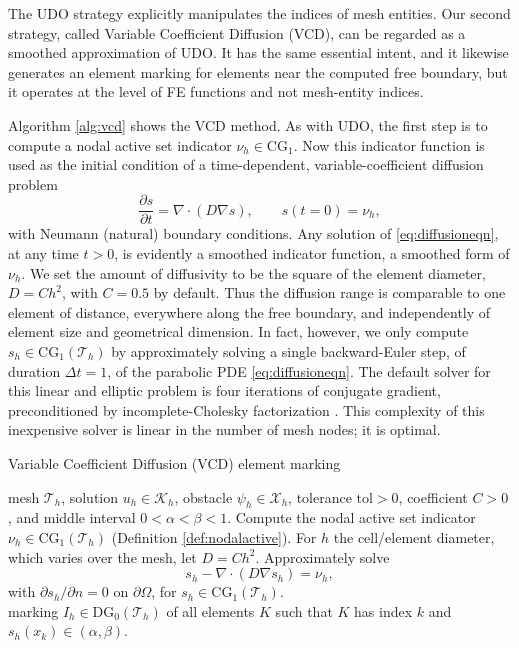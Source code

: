 \documentclass[]{interact}
\theoremstyle{plain}%
\theoremstyle{definition}
\theoremstyle{remark}
\newcommand{\grad}{\nabla}
\newcommand{\Div}{\nabla\cdot}
\newcommand{\cK}{\mathcal{K}}
\newcommand{\cT}{\mathcal{T}}
\newcommand{\cX}{\mathcal{X}}
\newcommand{\CG}{\text{CG}}
\newcommand{\DG}{\text{DG}}
\begin{document}
The UDO strategy explicitly manipulates the indices of mesh entities.  Our second strategy, called Variable Coefficient Diffusion (VCD), can be regarded as a smoothed approximation of UDO.  It has the same essential intent, and it likewise generates an element marking for elements near the computed free boundary, but it operates at the level of FE functions and not mesh-entity indices.

Algorithm \ref{alg:vcd} shows the VCD method.  As with UDO, the first step is to compute a nodal active set indicator $\nu_h \in \CG_1$.  Now this indicator function is used as the initial condition of a time-dependent, variable-coefficient diffusion problem
\begin{equation} \label{eq:diffusioneqn}
\frac{\partial s}{\partial t} = \Div\left(D \grad s\right), \qquad s(t=0) = \nu_h,
\end{equation}
with Neumann (natural) boundary conditions.  Any solution of \eqref{eq:diffusioneqn}, at any time $t>0$, is evidently a smoothed indicator function, a smoothed form of $\nu_h$.  We set the amount of diffusivity to be the square of the element diameter, $D=C h^2$, with $C=0.5$ by default.  Thus the diffusion range is comparable to one element of distance, everywhere along the free boundary, and independently of element size and geometrical dimension.  In fact, however, we only compute $s_h\in\CG_1(\cT_h)$ by approximately solving a single backward-Euler step, of duration $\Delta t = 1$, of the parabolic PDE \eqref{eq:diffusioneqn}.  The default solver for this linear and elliptic problem is four iterations of conjugate gradient, preconditioned by incomplete-Cholesky factorization \cite{Bueler2021}.  This complexity of this inexpensive solver is linear in the number of mesh nodes; it is optimal.

\begin{algorithm}[ht]
	\caption{Variable Coefficient Diffusion (VCD) element marking}
	\begin{algorithmic}[1]
		\Require mesh $\cT_h$, solution $u_h \in \cK_h$, obstacle $\psi_h \in \cX_h$, tolerance $\text{tol} > 0$, coefficient $C>0$, and middle interval $0 < \alpha < \beta < 1$.
		\State Compute the nodal active set indicator $\nu_h \in \CG_1(\cT_h)$ (Definition \ref{def:nodalactive}).
		\State For $h$ the cell/element diameter, which varies over the mesh, let $D=C h^2$.
		\State Approximately solve
		  $$s_h - \Div(D \grad s_h) = \nu_h,$$
		with $\partial s_h/\partial n=0$ on $\partial \Omega$, for $s_h\in\CG_1(\cT_h)$. \\
		\Return marking $I_h \in \DG_0(\cT_h)$ of all elements $K$ such that $K$ has index $k$ and $s_h(x_k) \in (\alpha,\beta)$.
    \end{algorithmic}
\label{alg:vcd}
\end{algorithm}
\end{document}
